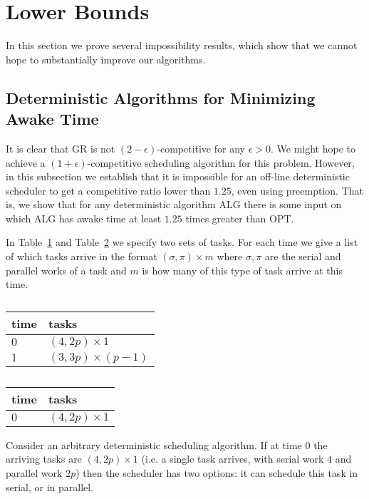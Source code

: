 \section{Lower Bounds}

In this section we prove several impossibility results, which
show that we cannot hope to substantially improve our algorithms.

\subsection{Deterministic Algorithms for Minimizing Awake Time}
It is clear that GR is not $(2-\epsilon)$-competitive for any
$\epsilon > 0$. We might hope to achieve a
$(1+\epsilon)$-competitive scheduling algorithm for this problem.
However, in this subsection we establish that it is impossible
for an off-line deterministic scheduler to get a competitive
ratio lower than $1.25$, even using preemption. That is, we show
that for any deterministic algorithm ALG there is some input on
which ALG has awake time at least $1.25$ times greater than OPT. 

In Table~\ref{tab:lowerboundFork1} and
Table~\ref{tab:lowerboundFork2} we specify two sets of tasks.
For each time we give a list of which tasks arrive in the format
$(\sigma, \pi)\times m$ where $\sigma, \pi$ are the serial and
parallel works of a task and $m$ is how many of this type of task
arrive at this time.

\begin{table}[H]
\caption{}
\label{tab:lowerboundFork1}
\centering
\begin{tabular}{|l|l|}
\hline
time & tasks                    \\ \hline
$0$  & $(4, 2p) \times 1$       \\ \hline
$1$  & $(3, 3p) \times (p-1)$ \\ \hline
\end{tabular}
\end{table}

\begin{table}[H]
\caption{}
\label{tab:lowerboundFork2}
\centering
\begin{tabular}{|l|l|}
\hline
time & tasks                    \\ \hline
$0$  & $(4, 2p) \times 1$       \\ \hline
\end{tabular}
\end{table}

Consider an arbitrary deterministic scheduling algorithm. If at
time $0$ the arriving tasks are $(4, 2p)\times 1$ (i.e. a single
task arrives, with serial work $4$ and parallel work $2p$) then
the scheduler has two options: it can schedule this task in
serial, or in parallel.

